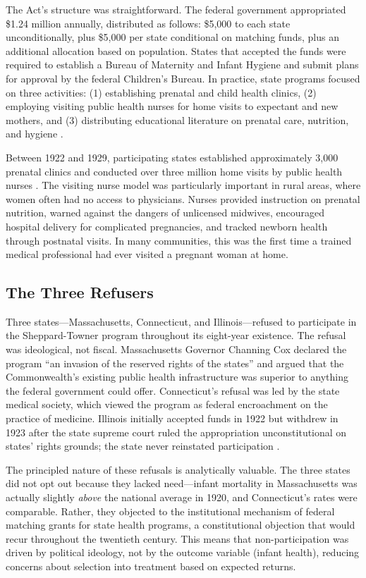 \documentclass[12pt]{article}
\begin{document}
The Act's structure was straightforward. The federal government appropriated \$1.24 million annually, distributed as follows: \$5,000 to each state unconditionally, plus \$5,000 per state conditional on matching funds, plus an additional allocation based on population. States that accepted the funds were required to establish a Bureau of Maternity and Infant Hygiene and submit plans for approval by the federal Children's Bureau. In practice, state programs focused on three activities: (1) establishing prenatal and child health clinics, (2) employing visiting public health nurses for home visits to expectant and new mothers, and (3) distributing educational literature on prenatal care, nutrition, and hygiene \citep{moehlingthomasson2014}.

Between 1922 and 1929, participating states established approximately 3,000 prenatal clinics and conducted over three million home visits by public health nurses \citep{moehlingthomasson2012}. The visiting nurse model was particularly important in rural areas, where women often had no access to physicians. Nurses provided instruction on prenatal nutrition, warned against the dangers of unlicensed midwives, encouraged hospital delivery for complicated pregnancies, and tracked newborn health through postnatal visits. In many communities, this was the first time a trained medical professional had ever visited a pregnant woman at home.

\subsection{The Three Refusers}

Three states---Massachusetts, Connecticut, and Illinois---refused to participate in the Sheppard-Towner program throughout its eight-year existence. The refusal was ideological, not fiscal. Massachusetts Governor Channing Cox declared the program ``an invasion of the reserved rights of the states'' and argued that the Commonwealth's existing public health infrastructure was superior to anything the federal government could offer. Connecticut's refusal was led by the state medical society, which viewed the program as federal encroachment on the practice of medicine. Illinois initially accepted funds in 1922 but withdrew in 1923 after the state supreme court ruled the appropriation unconstitutional on states' rights grounds; the state never reinstated participation \citep{lemon1973}.

The principled nature of these refusals is analytically valuable. The three states did not opt out because they lacked need---infant mortality in Massachusetts was actually slightly \textit{above} the national average in 1920, and Connecticut's rates were comparable. Rather, they objected to the institutional mechanism of federal matching grants for state health programs, a constitutional objection that would recur throughout the twentieth century. This means that non-participation was driven by political ideology, not by the outcome variable (infant health), reducing concerns about selection into treatment based on expected returns.
\end{document}

